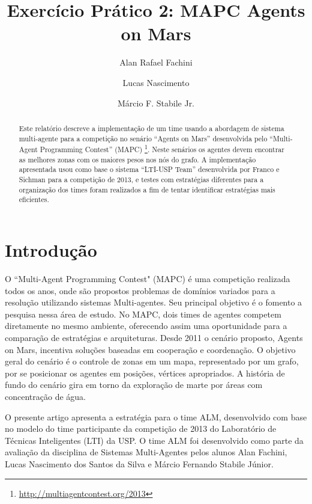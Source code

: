 \documentclass{llncs}
\begin{document}
\title{Exercício Prático 2: MAPC Agents on Mars}

\author{Alan Rafael Fachini \and Lucas Nascimento \and Márcio F. Stabile Jr.}

\maketitle

\begin{abstract}
Este relatório descreve a implementação de um time usando a abordagem de sistema multi-agente para a competição no senário ``Agents on Mars'' desenvolvida pelo ``Multi-Agent Programming Contest'' (MAPC) \footnote{\url{http://multiagentcontest.org/2013}}. Neste senários os agentes devem encontrar as melhores zonas com os maiores pesos nos nós do grafo. A implementação apresentada usou como base o sistema ``LTI-USP Team'' desenvolvida por Franco e Sichman \cite{franco2013improving} para a competição de 2013, e testes com estratégias diferentes para a organização dos times foram realizados a fim de tentar identificar estratégias mais eficientes.
\end{abstract}

\section{Introdução}

O “Multi-Agent Programming Contest" (MAPC) é uma competição realizada todos os anos, onde são propostos problemas de domínios variados para a resolução utilizando sistemas Multi-agentes. Seu principal objetivo é o fomento a pesquisa nessa área de estudo. No MAPC, dois times de agentes competem diretamente no mesmo ambiente, oferecendo assim uma oportunidade para a comparação de estratégias e arquiteturas. Desde 2011 o cenário proposto, Agents on Mars, incentiva soluções baseadas em cooperação e coordenação. O objetivo geral do cenário é o controle de zonas em um mapa, representado por um grafo, por se posicionar os agentes em posições, vértices apropriados. A história de fundo do cenário gira em torno da exploração de marte por áreas com concentração de água.

O presente artigo apresenta a estratégia para o time ALM, desenvolvido com base no modelo do time participante da competição de 2013 do Laboratório de Técnicas Inteligentes (LTI) da USP. O time ALM foi desenvolvido como parte da avaliação da disciplina de Sistemas Multi-Agentes pelos alunos Alan Fachini, Lucas Nascimento dos Santos da Silva e Márcio Fernando Stabile Júnior.
\end{document}
